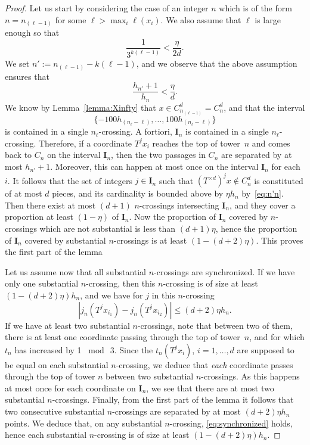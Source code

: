 \documentclass[10pt]{amsart}
\theoremstyle{definition}\newtheorem{defi}[theo]{Definition}\newtheorem{rema}[theo]{Remark}\newtheorem{exam}[theo]{Example}\newtheorem{exem}[theo]{Example}\newtheorem{nota}[theo]{Notation}
\newcommand{\egdef}{:=}
\newcommand{\cd}{C^{d}}
\newcommand{\td}{T^{\times d}}
\newcommand{\ci}{\boldsymbol I}
\begin{document}
\begin{proof}
Let us start by considering the case of an integer $n$ which is of the form $n=n_{(\ell-1)}$ for some $\ell>\max_i \ell(x_i)$. We also assume that $\ell$ is large enough so that
\[
\frac{1}{3^{k(\ell-1)}} < \frac{\eta}{2d}.
\]
We set $n'\egdef n_{(\ell-1)}-k(\ell-1)$, and we observe that the above assumption ensures that
\begin{equation}\label{eq:n'n}
\frac{h_{n'}+1}{h_n}< \frac{\eta}{d}.
\end{equation}
We know by Lemma~\ref{lemma:Xinfty} that $x\in \cd_{n_{(\ell-1)}}=\cd_n$, and that the interval
\[
\{-100 h_{(n_\ell-\ell)},\ldots,100 h_{(n_\ell-\ell)}\}
\]
is contained in a single $n_\ell$-crossing. A fortiori, $\ci_n$ is contained in a single $n_\ell$-crossing. Therefore, if a coordinate $T^jx_i$ reaches the top of tower~$n$ and comes back to $C_n$ on the interval $\ci_n$, then the two passages in $C_n$ are separated by at most $h_{n'}+1$. Moreover, this can happen at most once on the interval $\ci_n$ for each $i$. It follows that the set of integers $j\in\ci_n$ such that $(\td)^j x \notin \cd_n$ is constituted of at most $d$ pieces, and its cardinality is bounded above by $\eta h_n$ by~\eqref{eq:n'n}. Then there exist at most $(d+1)$ $n$-crossings intersecting $\ci_n$, and they cover a proportion at least $(1-\eta)$ of $\ci_n$. Now the proportion of $\ci_n$ covered by $n$-crossings which are not substantial is less than $(d+1)\eta$, hence the proportion of $\ci_n$ covered by substantial $n$-crossings is at least $(1-(d+2)\eta)$. This proves the first part of the lemma

Let us assume now that all substantial $n$-crossings are synchronized. If we have only one substantial $n$-crossing, then this $n$-crossing is of size at least $(1-(d+2)\eta) h_n$, and we have for $j$ in this $n$-crossing
\begin{equation}\label{eq:synchronized}
\left|j_n(T^j x_{i_1})-j_n(T^j x_{i_2})\right| \le (d+2)\eta h_n.
\end{equation}
If we have at least two substantial $n$-crossings, note that between two of them, there is at least one coordinate passing through the top of tower~$n$, and for which $t_n$ has increased by 1 $\bmod\ 3$. Since the $t_n(T^j x_i)$, $i=1,\ldots,d$ are supposed to be equal on each substantial $n$-crossing, we deduce that \emph{each} coordinate passes through the top of tower $n$ between two substantial $n$-crossings. As this happens at most once for each coordinate on $\ci_n$, we see that there are at most two substantial $n$-crossings. Finally, from the first part of the lemma it follows that two consecutive substantial $n$-crossings are separated by at most $(d+2)\eta h_n$ points. We deduce that, on any substantial $n$-crossing, \eqref{eq:synchronized} holds, hence each substantial $n$-crossing is of size at least $(1-(d+2)\eta) h_n$.
\end{proof}
\end{document}
